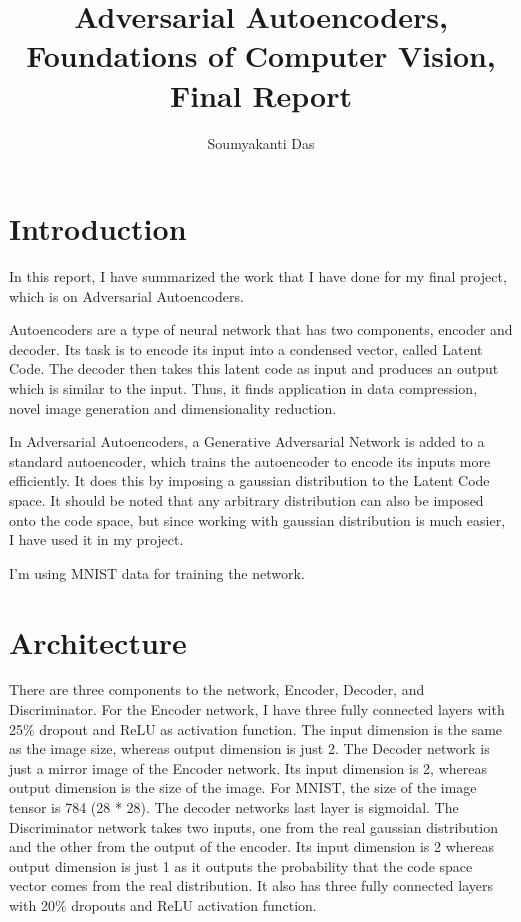 \documentclass[11pt]{article}
\title{Adversarial Autoencoders, Foundations of Computer Vision, Final Report}
\author{Soumyakanti Das}
\begin{document}
\maketitle

\section{Introduction}

In this report, I have summarized the work that I have done for my final project,
which is on Adversarial Autoencoders.

Autoencoders are a type of neural network that has two components, encoder and
decoder. Its task is to encode its input into a condensed vector, called Latent
Code. The decoder then takes this latent code as input and produces an output
which is similar to the input. Thus, it finds application in data compression,
novel image generation and dimensionality reduction.

In Adversarial Autoencoders, a Generative Adversarial Network is added to a
standard autoencoder, which trains the autoencoder to encode its inputs more
efficiently. It does this by imposing a gaussian distribution to the Latent
Code space. It should be noted that any arbitrary distribution can also be
imposed onto the code space, but since working with gaussian distribution is
much easier, I have used it in my project.

I'm using MNIST data for training the network.

\section{Architecture}

There are three components to the network, Encoder, Decoder, and Discriminator.
For the Encoder network, I have three fully connected layers with 25\% dropout
and ReLU as activation function. The input dimension is the same as the image
size, whereas output dimension is just 2.
The Decoder network is just a mirror image of the Encoder network. Its input
dimension is 2, whereas output dimension is the size of the image. For MNIST,
the size of the image tensor is 784 (28 * 28). The decoder networks last layer
is sigmoidal.
The Discriminator network takes two inputs, one from the real gaussian
distribution and the other from the output of the encoder. Its input dimension
is 2 whereas output dimension is just 1 as it outputs the probability that the
code space vector comes from the real distribution. It also has three fully
connected layers with 20\% dropouts and ReLU activation function.
\end{document}
